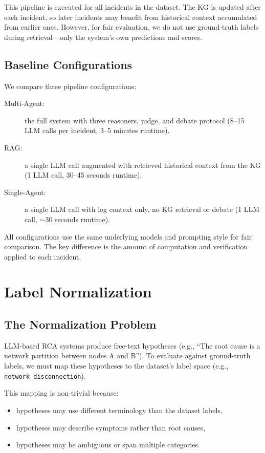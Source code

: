 This pipeline is executed for all incidents in the dataset. The KG is updated after each incident,
so later incidents may benefit from historical context accumulated from earlier ones. However, for
fair evaluation, we do not use ground-truth labels during retrieval---only the system's own
predictions and scores.

\subsection{Baseline Configurations}
We compare three pipeline configurations:
\begin{description}
  \item[Multi-Agent:] the full system with three reasoners, judge, and debate protocol (8--15 LLM
        calls per incident, 3--5 minutes runtime).
  \item[RAG:] a single LLM call augmented with retrieved historical context from the KG (1 LLM
        call, 30--45 seconds runtime).
  \item[Single-Agent:] a single LLM call with log context only, no KG retrieval or debate (1 LLM
        call, $\sim$30 seconds runtime).
\end{description}

All configurations use the same underlying models and prompting style for fair comparison. The key
difference is the amount of computation and verification applied to each incident.

\section{Label Normalization}

\subsection{The Normalization Problem}
LLM-based RCA systems produce free-text hypotheses (e.g., ``The root cause is a network partition
between nodes A and B''). To evaluate against ground-truth labels, we must map these hypotheses to
the dataset's label space (e.g., \texttt{network\_disconnection}).

This mapping is non-trivial because:
\begin{itemize}
  \item hypotheses may use different terminology than the dataset labels,
  \item hypotheses may describe symptoms rather than root causes,
  \item hypotheses may be ambiguous or span multiple categories.
\end{itemize}


